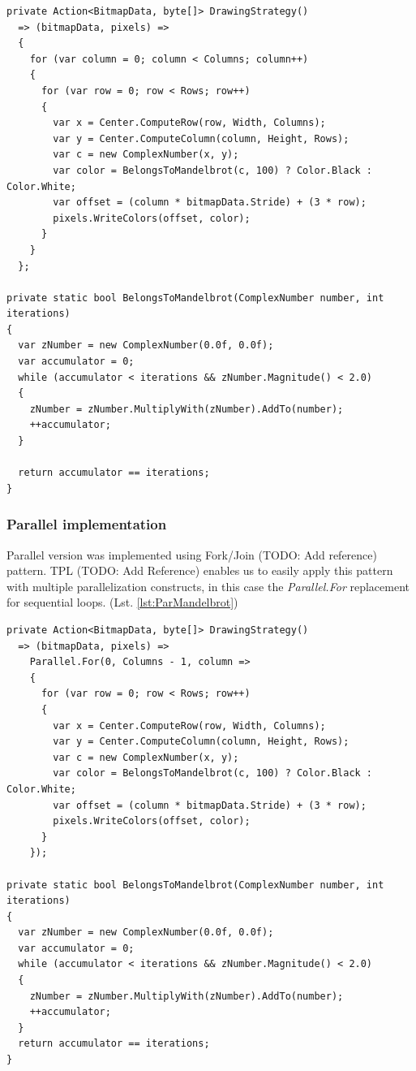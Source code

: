 \begin{lstlisting}[language={[sharp]c}, style=sharpcstyle, caption={Sequential Mandelbrot algorithm}, label={lst:SeqMandelbrot}]
private Action<BitmapData, byte[]> DrawingStrategy()
  => (bitmapData, pixels) =>
  {
    for (var column = 0; column < Columns; column++) 
    {
      for (var row = 0; row < Rows; row++) 
      {
        var x = Center.ComputeRow(row, Width, Columns); 
        var y = Center.ComputeColumn(column, Height, Rows); 
        var c = new ComplexNumber(x, y);
        var color = BelongsToMandelbrot(c, 100) ? Color.Black : Color.White; 
        var offset = (column * bitmapData.Stride) + (3 * row);
        pixels.WriteColors(offset, color);
      }
    }
  };

private static bool BelongsToMandelbrot(ComplexNumber number, int iterations)
{
  var zNumber = new ComplexNumber(0.0f, 0.0f);
  var accumulator = 0;
  while (accumulator < iterations && zNumber.Magnitude() < 2.0)
  {
    zNumber = zNumber.MultiplyWith(zNumber).AddTo(number);
    ++accumulator;
  }

  return accumulator == iterations;
}
\end{lstlisting}

\subsubsection{Parallel implementation}
Parallel version was implemented using Fork/Join (TODO: Add reference) pattern. TPL (TODO: Add Reference) enables us to easily apply this pattern with multiple parallelization constructs, in this case the \emph{Parallel.For} replacement for sequential loops. (Lst. \ref{lst:ParMandelbrot})

\begin{lstlisting}[language={[sharp]c}, style=sharpcstyle, caption={Parallel Mandelbrot algorithm}, label={lst:ParMandelbrot}]
private Action<BitmapData, byte[]> DrawingStrategy()
  => (bitmapData, pixels) =>
    Parallel.For(0, Columns - 1, column =>
    {
      for (var row = 0; row < Rows; row++)
      {
        var x = Center.ComputeRow(row, Width, Columns);
        var y = Center.ComputeColumn(column, Height, Rows);
        var c = new ComplexNumber(x, y);
        var color = BelongsToMandelbrot(c, 100) ? Color.Black : Color.White;
        var offset = (column * bitmapData.Stride) + (3 * row);
        pixels.WriteColors(offset, color);
      }
    });

private static bool BelongsToMandelbrot(ComplexNumber number, int iterations)
{
  var zNumber = new ComplexNumber(0.0f, 0.0f);
  var accumulator = 0;
  while (accumulator < iterations && zNumber.Magnitude() < 2.0)
  {
    zNumber = zNumber.MultiplyWith(zNumber).AddTo(number);
    ++accumulator;
  }
  return accumulator == iterations;
}
\end{lstlisting}

